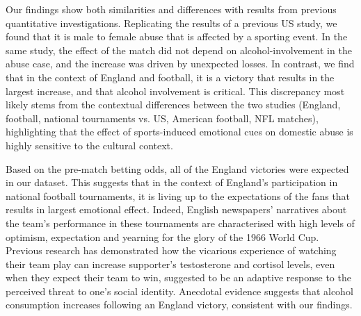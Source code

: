 \documentclass[12pt, letterpaper]{article}
\begin{document}
Our findings show both similarities and differences with results from previous quantitative investigations. Replicating the results of a previous US study, we found that it is male to female abuse that is affected by a sporting event\autocite{Card2011}. In the same study, the effect of the match did not depend on alcohol-involvement in the abuse case, and the increase was driven by unexpected losses. In contrast, we find that in the context of England and football, it is a victory that results in the largest increase, and that alcohol involvement is critical. This discrepancy most likely stems from the contextual differences between the two studies (England, football, national tournaments vs. US, American football, NFL matches), highlighting that the effect of sports-induced emotional cues on domestic abuse is highly sensitive to the cultural context. 

Based on the pre-match betting odds, all of the England victories were expected in our dataset. This suggests that in the context of England's participation in national football tournaments, it is living up to the expectations of the fans that results in largest emotional effect. Indeed, English newspapers' narratives about the team's performance in these tournaments are characterised with high levels of optimism, expectation and yearning for the glory of the 1966 World Cup\autocite{Vincent2010}. Previous research has demonstrated how the vicarious experience of watching their team play can increase supporter's testosterone and cortisol levels, even when they expect their team to win, suggested to be an adaptive response to the perceived threat to one's social identity\autocite{VanderMeij2012}. Anecdotal evidence suggests that alcohol consumption increases following an England victory\autocite{Davies2018}, consistent with our findings.
\end{document}
